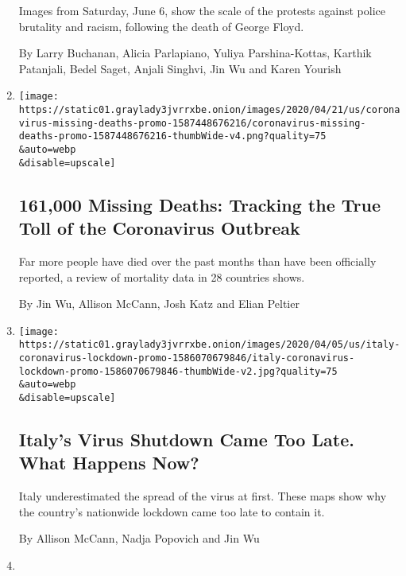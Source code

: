\begin{enumerate}
  Images from Saturday, June 6, show the scale of the protests against
  police brutality and racism, following the death of George Floyd.

  By Larry Buchanan, Alicia Parlapiano, Yuliya Parshina-Kottas, Karthik
  Patanjali, Bedel Saget, Anjali Singhvi, Jin Wu and Karen Yourish
\item
  \href{/interactive/2020/04/21/world/coronavirus-missing-deaths.html}{}

  \texttt{[image: https://static01.graylady3jvrrxbe.onion/images/2020/04/21/us/coronavirus-missing-deaths-promo-1587448676216/coronavirus-missing-deaths-promo-1587448676216-thumbWide-v4.png?quality=75\\\&auto=webp\\\&disable=upscale]}

  \hypertarget{161000-missing-deaths-tracking-the-true-toll-of-the-coronavirus-outbreak}{%
  \subsection{161,000 Missing Deaths: Tracking the True Toll of the
  Coronavirus
  Outbreak}\label{161000-missing-deaths-tracking-the-true-toll-of-the-coronavirus-outbreak}}

  Far more people have died over the past months than have been
  officially reported, a review of mortality data in 28 countries shows.

  By Jin Wu, Allison McCann, Josh Katz and Elian Peltier
\item
  \href{/interactive/2020/04/05/world/europe/italy-coronavirus-lockdown-reopen.html}{}

  \texttt{[image: https://static01.graylady3jvrrxbe.onion/images/2020/04/05/us/italy-coronavirus-lockdown-promo-1586070679846/italy-coronavirus-lockdown-promo-1586070679846-thumbWide-v2.jpg?quality=75\\\&auto=webp\\\&disable=upscale]}

  \hypertarget{italys-virus-shutdown-came-too-late-what-happens-now}{%
  \subsection{Italy's Virus Shutdown Came Too Late. What Happens
  Now?}\label{italys-virus-shutdown-came-too-late-what-happens-now}}

  Italy underestimated the spread of the virus at first. These maps show
  why the country's nationwide lockdown came too late to contain it.

  By Allison McCann, Nadja Popovich and Jin Wu
\item
  \href{/interactive/2020/03/22/world/coronavirus-spread.html}{}


\end{enumerate}
